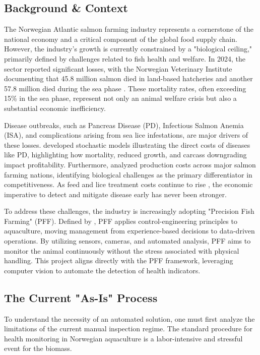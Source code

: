 \documentclass[12pt,a4paper]{article}
\begin{document}
\subsection{Background \& Context}
The Norwegian Atlantic salmon farming industry represents a cornerstone of the national economy and a critical component of the global food supply chain. However, the industry's growth is currently constrained by a "biological ceiling," primarily defined by challenges related to fish health and welfare. In 2024, the sector reported significant losses, with the Norwegian Veterinary Institute documenting that 45.8 million salmon died in land-based hatcheries and another 57.8 million died during the sea phase \citep{NVI_2025_NFHR2024}. These mortality rates, often exceeding 15\% in the sea phase, represent not only an animal welfare crisis but also a substantial economic inefficiency.

Disease outbreaks, such as Pancreas Disease (PD), Infectious Salmon Anemia (ISA), and complications arising from sea lice infestations, are major drivers of these losses. \cite{AUNSMO2010233} developed stochastic models illustrating the direct costs of diseases like PD, highlighting how mortality, reduced growth, and carcass downgrading impact profitability. Furthermore, \cite{IVERSEN2020735089} analyzed production costs across major salmon farming nations, identifying biological challenges as the primary differentiator in competitiveness. As feed and lice treatment costs continue to rise \citep{Iversen2017}, the economic imperative to detect and mitigate disease early has never been stronger.

To address these challenges, the industry is increasingly adopting "Precision Fish Farming" (PFF). Defined by \cite{FORE2018176}, PFF applies control-engineering principles to aquaculture, moving management from experience-based decisions to data-driven operations. By utilizing sensors, cameras, and automated analysis, PFF aims to monitor the animal continuously without the stress associated with physical handling. This project aligns directly with the PFF framework, leveraging computer vision to automate the detection of health indicators.

\subsection{The Current "As-Is" Process}
To understand the necessity of an automated solution, one must first analyze the limitations of the current manual inspection regime. The standard procedure for health monitoring in Norwegian aquaculture is a labor-intensive and stressful event for the biomass.
\end{document}
